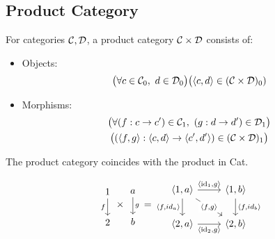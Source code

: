\subsection{Product Category}
\begin{definition}
  For categories $\mathcal{C},\mathcal{D}$, a product category $\mathcal{C}\times \mathcal{D}$ consists of:
  \parencite{awodey:category_theory}
  \begin{itemize}
    \item Objects:
      \[\big(\forall c \in \mathcal{C}_0,\ d \in \mathcal{D}_0\big)
        \big(\langle c, d\rangle\in (\mathcal{C}\times \mathcal{D})_0)\]
    \item Morphisms:
      \[
        \begin{gathered}
          \big(\forall (f: c \to c')\in \mathcal{C}_1,\ (g:d \to d')\in \mathcal{D}_1\big)\\
          \big((\langle f,g\rangle : \langle c,d\rangle \to \langle c', d'\rangle)\in (\mathcal{C}\times \mathcal{D})_1\big)
        \end{gathered}
      \]
  \end{itemize}
\end{definition}

\begin{remark}
  The product category coincides with the product in Cat.
\end{remark}

\begin{example}
  \[
    \begin{tikzcd}[ampersand replacement=\&]
      1 \\
      2
      \arrow["f"', from=1-1, to=2-1]
    \end{tikzcd}
    \times
    \begin{tikzcd}
      a \\
      b
      \arrow["g", from=1-1, to=2-1]
    \end{tikzcd}
    =
    \begin{tikzcd}[ampersand replacement=\&]
      {\langle1,a\rangle} \& {\langle1,b\rangle} \\
      {\langle2,a\rangle} \& {\langle2,b\rangle}
      \arrow["{\langle \id_1,g\rangle}", from=1-1, to=1-2]
      \arrow["{\langle f,id_a\rangle}"', from=1-1, to=2-1]
      \arrow["{\langle \id_2,g\rangle}"', from=2-1, to=2-2]
      \arrow["{\langle f,id_b\rangle}", from=1-2, to=2-2]
      \arrow["{\langle f,g\rangle}"{description}, from=1-1, to=2-2]
    \end{tikzcd}
  \]
\end{example}

